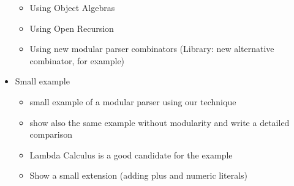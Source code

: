\begin{itemize}
\begin{itemize}
    \item Using Object Algebras
    \item Using Open Recursion
    \item Using new modular parser combinators (Library: new alternative combinator, for example)
    \end{itemize}
\item Small example
    \begin{itemize}
    \item small example of a modular parser using our technique
    \item show also the same example without modularity and write a detailed comparison
    \item Lambda Calculus is a good candidate for the example
    \item Show a small extension (adding plus and numeric literals)
    \end{itemize}
\end{itemize}
